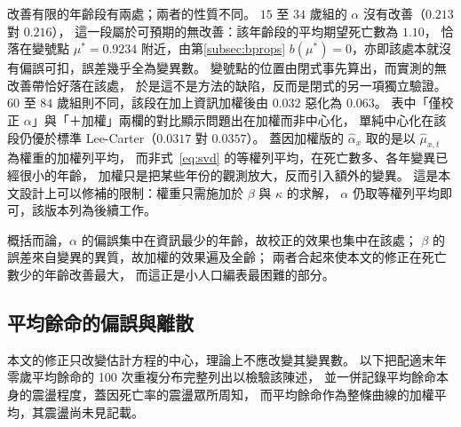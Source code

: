 \documentclass[UTF8, fontset=macnew, a4paper, 12pt]{ctexart}
\begin{document}
改善有限的年齡段有兩處；兩者的性質不同。
$15$ 至 $34$ 歲組的 $\alpha$ 沒有改善（$0.213$ 對 $0.216$），
這一段屬於可預期的無改善：該年齡段的平均期望死亡數為 $1.10$，
恰落在變號點 $\mu^{\ast}=0.9234$ 附近，由第\ref{subsec:bprops}
$b(\mu^{\ast})=0$，亦即該處本就沒有偏誤可扣，誤差幾乎全為變異數。
變號點的位置由閉式事先算出，而實測的無改善帶恰好落在該處，
於是這不是方法的缺陷，反而是閉式的另一項獨立驗證。
$60$ 至 $84$ 歲組則不同，該段在加上資訊加權後由 $0.032$ 惡化為 $0.063$。
表中「僅校正 $\alpha$」與「＋加權」兩欄的對比顯示問題出在加權而非中心化，
單純中心化在該段仍優於標準 Lee-Carter（$0.0317$ 對 $0.0357$）。
蓋因加權版的 $\hat\alpha_x$ 取的是以 $\hat\mu_{x,t}$ 為權重的加權列平均，
而非式~\eqref{eq:svd} 的等權列平均，在死亡數多、各年變異已經很小的年齡，
加權只是把某些年份的觀測放大，反而引入額外的變異。
這是本文設計上可以修補的限制：權重只需施加於 $\beta$ 與 $\kappa$ 的求解，
$\alpha$ 仍取等權列平均即可，該版本列為後續工作。

概括而論，$\alpha$ 的偏誤集中在資訊最少的年齡，故校正的效果也集中在該處；
$\beta$ 的誤差來自變異的異質，故加權的效果遍及全齡；
兩者合起來使本文的修正在死亡數少的年齡改善最大，
而這正是小人口編表最困難的部分。

\subsection{平均餘命的偏誤與離散}\label{sec:e0var}

本文的修正只改變估計方程的中心，理論上不應改變其變異數。
以下把配適末年零歲平均餘命的 100 次重複分布完整列出以檢驗該陳述，
並一併記錄平均餘命本身的震盪程度，蓋因死亡率的震盪眾所周知，
而平均餘命作為整條曲線的加權平均，其震盪尚未見記載。
\end{document}
